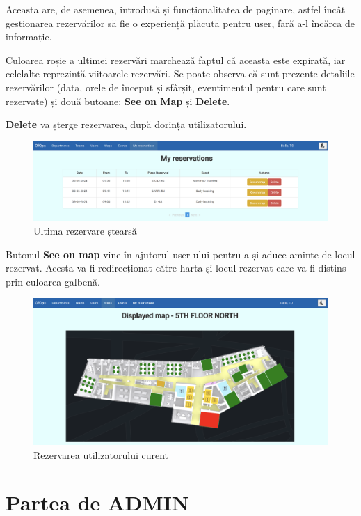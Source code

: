 Aceasta are, de asemenea, introdusă și funcționalitatea de paginare, astfel încât gestionarea rezervărilor să fie o experiență plăcută pentru user, fără a-l încărca de informație.

Culoarea roșie a ultimei rezervări marchează faptul că aceasta este expirată, iar celelalte reprezintă viitoarele rezervări. Se poate observa că sunt prezente detaliile rezervărilor (data, orele de început și sfârșit, eventimentul pentru care sunt rezervate) și două butoane: \textbf{See on Map} și \textbf{Delete}.

\textbf{Delete} va șterge rezervarea, după dorința utilizatorului.

\begin{figure}[!htb]
    \centering
    \includegraphics[width=0.9\linewidth]{images/delete.png}
    \caption{Ultima rezervare ștearsă}
    \label{fig:delete}
\end{figure}

Butonul \textbf{See on map} vine în ajutorul user-ului pentru a-și aduce aminte de locul rezervat. Acesta va fi redirecționat către harta și locul rezervat care va fi distins prin culoarea galbenă.

\begin{figure}[!htb]
    \centering
    \includegraphics[width=0.9\linewidth]{images/rezerv utiliz.png}
    \caption{Rezervarea utilizatorului curent}
    \label{fig:rezerv utiliz}
\end{figure}

\section{Partea de ADMIN}